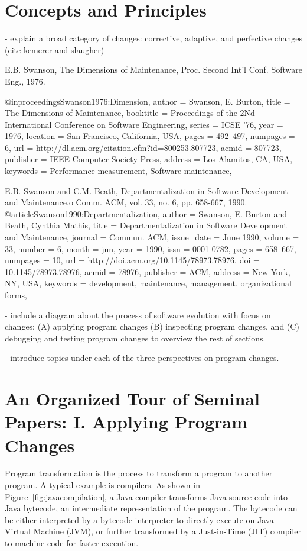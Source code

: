 \documentclass[runningheads,a4paper]{llncs}
\begin{document}
\section{Concepts and Principles}

- explain a broad category of changes: corrective, adaptive, and perfective changes (cite kemerer and slaugher)  

E.B. Swanson, The Dimensions of Maintenance, Proc. Second Int'l Conf. Software Eng., 1976.

@inproceedings{Swanson1976:Dimension, 
 author = {Swanson, E. Burton},
 title = {The Dimensions of Maintenance},
 booktitle = {Proceedings of the 2Nd International Conference on Software Engineering},
 series = {ICSE '76},
 year = {1976},
 location = {San Francisco, California, USA},
 pages = {492--497},
 numpages = {6},
 url = {http://dl.acm.org/citation.cfm?id=800253.807723},
 acmid = {807723},
 publisher = {IEEE Computer Society Press},
 address = {Los Alamitos, CA, USA},
 keywords = {Performance measurement, Software maintenance},
} 

E.B. Swanson and C.M. Beath, Departmentalization in Software Development and Maintenance,o Comm. ACM, vol. 33, no. 6, pp. 658-667, 1990.
@article{Swanson1990:Departmentalization, 
 author = {Swanson, E. Burton and Beath, Cynthia Mathis},
 title = {Departmentalization in Software Development and Maintenance},
 journal = {Commun. ACM},
 issue_date = {June 1990},
 volume = {33},
 number = {6},
 month = jun,
 year = {1990},
 issn = {0001-0782},
 pages = {658--667},
 numpages = {10},
 url = {http://doi.acm.org/10.1145/78973.78976},
 doi = {10.1145/78973.78976},
 acmid = {78976},
 publisher = {ACM},
 address = {New York, NY, USA},
 keywords = {development, maintenance, management, organizational forms},
} 

- include a diagram about the process of software evolution with focus on changes: (A) applying program changes (B) inspecting program changes, and (C) debugging and testing program changes to overview the rest of sections.  

- introduce topics under each of the three perspectives on program changes. 

\section{An Organized Tour of Seminal Papers: I. Applying Program Changes}

Program transformation is the process to transform a program to another program. A typical example is compilers. As shown in Figure~\ref{fig:javacompilation}, a Java compiler transforms Java source code into Java bytecode, an intermediate representation of the program. The bytecode can be either interpreted by a bytecode interpreter to directly execute on Java Virtual Machine (JVM), or further transformed by a Just-in-Time (JIT) compiler to machine code for faster execution.
\end{document}
